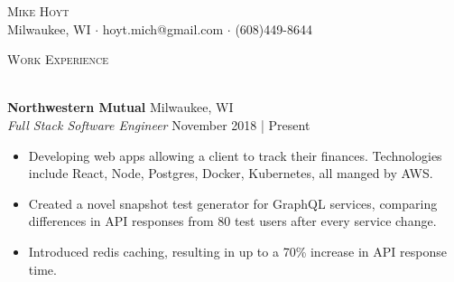 \documentclass[a4paper]{article}
\newcommand{\lineunder} {
    \vspace*{-8pt} \\
    \hspace*{-18pt} \hrulefill \\
}
\newcommand{\header} [1] {
    {\hspace*{-18pt}\vspace*{6pt} \textsc{#1}}
    \vspace*{-6pt} \lineunder
}
\begin{document}
\vspace*{-40pt}



\vspace*{-10pt}
\begin{center}
	{\Huge \scshape {Mike Hoyt}}\\
	Milwaukee, WI $\cdot$ hoyt.mich@gmail.com $\cdot$ (608)449-8644\\
\end{center}


\header{Work Experience}
\vspace{1mm}

\textbf{Northwestern Mutual} \hfill Milwaukee, WI\\
\textit{Full Stack Software Engineer} \hfill November 2018 | Present\\
\vspace{-1mm}
\begin{itemize} \itemsep 1pt
	\item Developing web apps allowing a client to track their finances. Technologies include React, Node, Postgres, Docker, Kubernetes, all manged by AWS.
	\item Created a novel snapshot test generator for GraphQL services, comparing differences in API responses from 80 test users after every service change.
	\item Introduced redis caching, resulting in up to a 70\% increase in API response time.
\end{itemize}
\vspace{-1mm}
\end{document}
